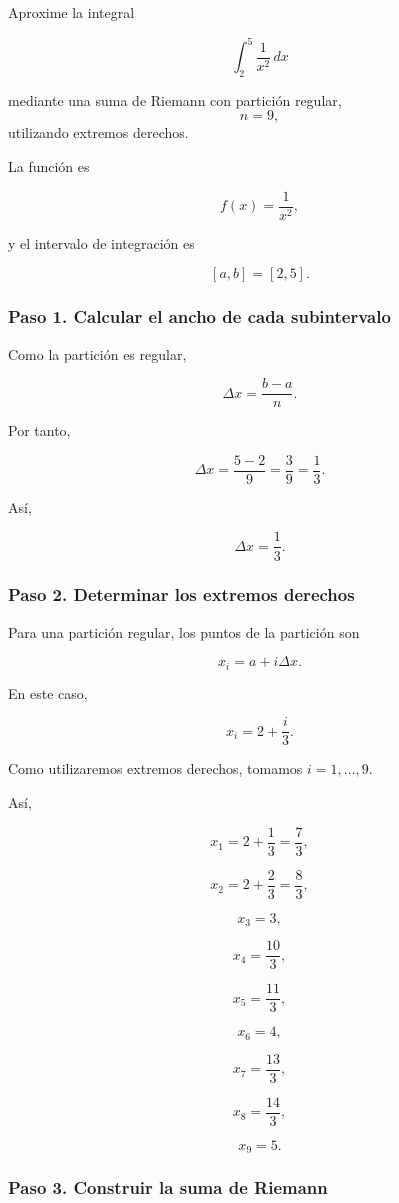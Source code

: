 \documentclass[12pt]{article}
\begin{document}
Aproxime la integral

\[
\int_{2}^{5}\frac{1}{x^2}\,dx
\]

mediante una suma de Riemann con partición regular,
\[
n=9,
\]
utilizando extremos derechos.

La función es

\[
f(x)=\frac{1}{x^2},
\]

y el intervalo de integración es

\[
[a,b]=[2,5].
\]

\subsubsection*{Paso 1. Calcular el ancho de cada subintervalo}

Como la partición es regular,

\[
\Delta x=\frac{b-a}{n}.
\]

Por tanto,

\[
\Delta x
=
\frac{5-2}{9}
=
\frac{3}{9}
=
\frac13.
\]

Así,

\[
\boxed{\Delta x=\frac13}.
\]

\subsubsection*{Paso 2. Determinar los extremos derechos}

Para una partición regular, los puntos de la partición son

\[
x_i=a+i\Delta x.
\]

En este caso,

\[
x_i
=
2+\frac{i}{3}.
\]

Como utilizaremos extremos derechos, tomamos \(i=1,\ldots,9\).

Así,

\[
x_1=2+\frac13=\frac73,
\]

\[
x_2=2+\frac23=\frac83,
\]

\[
x_3=3,
\]

\[
x_4=\frac{10}{3},
\]

\[
x_5=\frac{11}{3},
\]

\[
x_6=4,
\]

\[
x_7=\frac{13}{3},
\]

\[
x_8=\frac{14}{3},
\]

\[
x_9=5.
\]

\subsubsection*{Paso 3. Construir la suma de Riemann}
\end{document}
